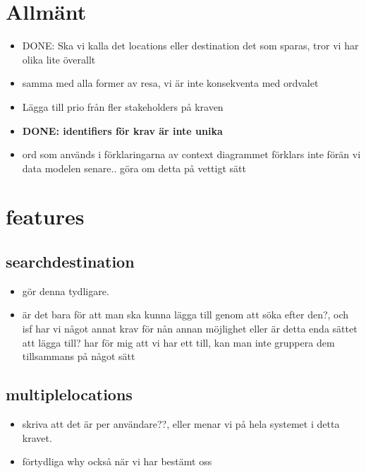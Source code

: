 \documentclass[a4paper]{article}
\begin{document}
	\thispagestyle{empty}
	\setcounter{page}{0}
	\pagebreak
	\tableofcontents
	\pagebreak

\section{Allmänt}
\begin{itemize}

	\item DONE: Ska vi kalla det locations eller destination det som sparas, tror vi har olika lite överallt
	\item samma med alla former av resa, vi är inte konsekventa med ordvalet
	\item Lägga till prio från fler stakeholders på kraven
	\item \textbf{DONE: identifiers för krav är inte unika}
	\item ord som används i förklaringarna av context diagrammet förklars inte förän vi data modelen senare.. göra om detta på vettigt sätt
\end{itemize}


\section{features}
	\subsection{searchdestination}
		\begin{itemize}
			\item gör denna tydligare. 
			\item är det bara för att man ska kunna lägga till genom att söka efter den?, och isf har vi något annat krav för nån annan möjlighet eller är detta enda sättet att lägga till? har för mig att vi har ett till, kan man inte gruppera dem tillsammans på något sätt
		\end{itemize}
		
	\subsection{multiplelocations}
		\begin{itemize}
			\item skriva att det är per användare??, eller menar vi på hela systemet i detta kravet. 
			\item förtydliga why också när vi har bestämt oss
		\end{itemize}
		
\end{document}
